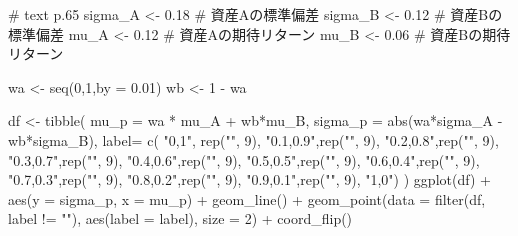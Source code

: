 \documentclass[
  letterpaper,
  pandoc,
  ja=standard,
  jafont = hiragino-pron]{ltjsbook}
\newenvironment{Shaded}{\begin{snugshade}}{\end{snugshade}}
\newcommand{\AttributeTok}[1]{\textcolor[rgb]{0.40,0.45,0.13}{#1}}
\newcommand{\CommentTok}[1]{\textcolor[rgb]{0.37,0.37,0.37}{#1}}
\newcommand{\DecValTok}[1]{\textcolor[rgb]{0.68,0.00,0.00}{#1}}
\newcommand{\FloatTok}[1]{\textcolor[rgb]{0.68,0.00,0.00}{#1}}
\newcommand{\FunctionTok}[1]{\textcolor[rgb]{0.28,0.35,0.67}{#1}}
\newcommand{\NormalTok}[1]{\textcolor[rgb]{0.00,0.23,0.31}{#1}}
\newcommand{\OtherTok}[1]{\textcolor[rgb]{0.00,0.23,0.31}{#1}}
\newcommand{\SpecialCharTok}[1]{\textcolor[rgb]{0.37,0.37,0.37}{#1}}
\newcommand{\StringTok}[1]{\textcolor[rgb]{0.13,0.47,0.30}{#1}}
\begin{document}
\begin{Shaded}
\begin{Highlighting}[]
\CommentTok{\# text p.65}
\NormalTok{sigma\_A }\OtherTok{\textless{}{-}} \FloatTok{0.18}  \CommentTok{\# 資産Aの標準偏差}
\NormalTok{sigma\_B }\OtherTok{\textless{}{-}} \FloatTok{0.12}  \CommentTok{\# 資産Bの標準偏差}
\NormalTok{mu\_A }\OtherTok{\textless{}{-}} \FloatTok{0.12}     \CommentTok{\# 資産Aの期待リターン}
\NormalTok{mu\_B }\OtherTok{\textless{}{-}} \FloatTok{0.06}     \CommentTok{\# 資産Bの期待リターン}

\NormalTok{wa }\OtherTok{\textless{}{-}} \FunctionTok{seq}\NormalTok{(}\DecValTok{0}\NormalTok{,}\DecValTok{1}\NormalTok{,}\AttributeTok{by =} \FloatTok{0.01}\NormalTok{)}
\NormalTok{wb }\OtherTok{\textless{}{-}} \DecValTok{1} \SpecialCharTok{{-}}\NormalTok{ wa}


\NormalTok{df }\OtherTok{\textless{}{-}} \FunctionTok{tibble}\NormalTok{(}
  \AttributeTok{mu\_p =}\NormalTok{ wa }\SpecialCharTok{*}\NormalTok{ mu\_A }\SpecialCharTok{+}\NormalTok{ wb}\SpecialCharTok{*}\NormalTok{mu\_B,}
  \AttributeTok{sigma\_p =} \FunctionTok{abs}\NormalTok{(wa}\SpecialCharTok{*}\NormalTok{sigma\_A }\SpecialCharTok{{-}}\NormalTok{ wb}\SpecialCharTok{*}\NormalTok{sigma\_B),}
  \AttributeTok{label=} \FunctionTok{c}\NormalTok{(}
  \StringTok{"0,1"}\NormalTok{, }\FunctionTok{rep}\NormalTok{(}\StringTok{""}\NormalTok{, }\DecValTok{9}\NormalTok{),}
  \StringTok{"0.1,0.9"}\NormalTok{,}\FunctionTok{rep}\NormalTok{(}\StringTok{""}\NormalTok{, }\DecValTok{9}\NormalTok{),}
  \StringTok{"0.2,0.8"}\NormalTok{,}\FunctionTok{rep}\NormalTok{(}\StringTok{""}\NormalTok{, }\DecValTok{9}\NormalTok{),}
  \StringTok{"0.3,0.7"}\NormalTok{,}\FunctionTok{rep}\NormalTok{(}\StringTok{""}\NormalTok{, }\DecValTok{9}\NormalTok{),}
  \StringTok{"0.4,0.6"}\NormalTok{,}\FunctionTok{rep}\NormalTok{(}\StringTok{""}\NormalTok{, }\DecValTok{9}\NormalTok{),}
  \StringTok{"0.5,0.5"}\NormalTok{,}\FunctionTok{rep}\NormalTok{(}\StringTok{""}\NormalTok{, }\DecValTok{9}\NormalTok{),}
  \StringTok{"0.6,0.4"}\NormalTok{,}\FunctionTok{rep}\NormalTok{(}\StringTok{""}\NormalTok{, }\DecValTok{9}\NormalTok{),}
  \StringTok{"0.7,0.3"}\NormalTok{,}\FunctionTok{rep}\NormalTok{(}\StringTok{""}\NormalTok{, }\DecValTok{9}\NormalTok{),}
  \StringTok{"0.8,0.2"}\NormalTok{,}\FunctionTok{rep}\NormalTok{(}\StringTok{""}\NormalTok{, }\DecValTok{9}\NormalTok{),}
  \StringTok{"0.9,0.1"}\NormalTok{,}\FunctionTok{rep}\NormalTok{(}\StringTok{""}\NormalTok{, }\DecValTok{9}\NormalTok{),}
  \StringTok{"1,0"}\NormalTok{)}
\NormalTok{)}
\FunctionTok{ggplot}\NormalTok{(df) }\SpecialCharTok{+} \FunctionTok{aes}\NormalTok{(}\AttributeTok{y =}\NormalTok{ sigma\_p, }\AttributeTok{x =}\NormalTok{ mu\_p) }\SpecialCharTok{+} \FunctionTok{geom\_line}\NormalTok{() }\SpecialCharTok{+} \FunctionTok{geom\_point}\NormalTok{(}\AttributeTok{data =} \FunctionTok{filter}\NormalTok{(df, label }\SpecialCharTok{!=} \StringTok{""}\NormalTok{), }\FunctionTok{aes}\NormalTok{(}\AttributeTok{label =}\NormalTok{ label), }\AttributeTok{size =} \DecValTok{2}\NormalTok{) }\SpecialCharTok{+} \FunctionTok{coord\_flip}\NormalTok{()}
\end{Highlighting}
\end{Shaded}
\end{document}
